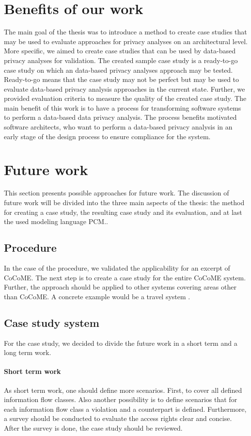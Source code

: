 \section{Benefits of our work}
The main goal of the thesis was to introduce a method to create case studies that may be used to evaluate approaches for privacy analyses on an architectural level. More specific, we aimed to create case studies that can be used by data-based privacy analyses for validation. The created sample case study is a ready-to-go case study on which an data-based privacy analyses approach may be tested. Ready-to-go means that the case study may not be perfect but may be used to evaluate data-based privacy analysis approaches in the current state.  Further, we provided evaluation criteria to measure the quality of the created case study. The main benefit of this work is to have a process for transforming software systems to perform a data-based data privacy analysis. The process benefits motivated software architects, who want to perform a data-based privacy analysis in an early stage of the design process to ensure compliance for the system.
\section{Future work} 
\label{FW}
This section presents possible approaches for future work. The discussion of future work will be divided into the three main aspects of the thesis: the method for creating a case study, the resulting case study and its evaluation, and at last the used modeling language PCM.. 
\subsection{Procedure}
In the case of the procedure, we validated the applicability for an excerpt of CoCoME. The next step is to create a case study for the entire CoCoME system. Further, the approach should be applied to other systems covering areas other than CoCoME. A concrete example would be a travel system \cite{Travelsystem}.
\subsection{Case study system}
For the case study, we decided to divide the future work in a short term and a long term work.\\
\paragraph{Short term work}
As short term work, one should define more scenarios. First, to cover all defined information flow classes. Also another possibility is to define scenarios that for each information flow class a violation and a counterpart is defined. Furthermore, a survey should be conducted to evaluate the access rights clear and concise. After the survey is done, the case study should be reviewed.
